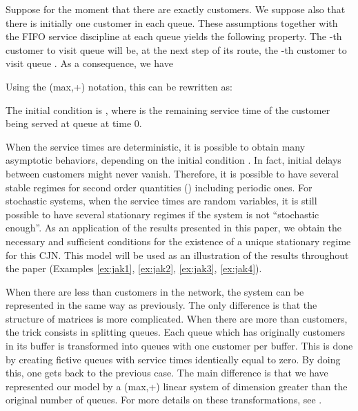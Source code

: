 \documentclass[11pt,titlepage]{article}
\newcommand{\parag}{\medskip\noindent}
\begin{document}
\parag
Suppose for the moment that there are exactly
 customers. We suppose also that there is initially one customer in each
queue.  These assumptions together with the FIFO service discipline at each
queue yields the following property. The -th customer to visit queue 
will be, at the next step of its route,  the -th customer to visit queue
. 
As a consequence, we have

Using the (max,+) notation, this can be
rewritten as:

The initial condition is , where   is the remaining
service time of the customer being served at queue  at time 0.

\parag
When the service times are
deterministic, it is possible to obtain many asymptotic behaviors, depending
on the initial condition . In fact, initial delays between customers
might never vanish. Therefore, it is possible to
have several 
stable regimes 
for second order quantities () including periodic ones. For
stochastic systems, when the service times are random variables, it is still
possible to have several stationary regimes if the system is not ``stochastic
enough''.  As an application of the results
presented in this paper, we obtain the necessary and sufficient conditions
for the existence of a unique stationary regime for this CJN.
This model will be used as an illustration of the
results throughout the paper (Examples \ref{ex:jak1}, \ref{ex:jak2},
\ref{ex:jak3}, \ref{ex:jak4}).

\parag
When there are less than  customers in the network,
the system can be represented in the same way as previously. The only
difference is that the structure of matrices  is more complicated.
When there are more than  customers, the trick consists in splitting
queues. Each
queue which has originally  customers in its buffer is transformed into
 queues with one customer per buffer. This
is done by creating  fictive queues with service times identically
equal to zero. By doing this, one gets back to the previous case. The
main difference is that we have represented our model by a (max,+) linear
system of dimension greater than the original number of queues. For more
details on these transformations, see \cite{mair95e}. 

\parag
\end{document}
